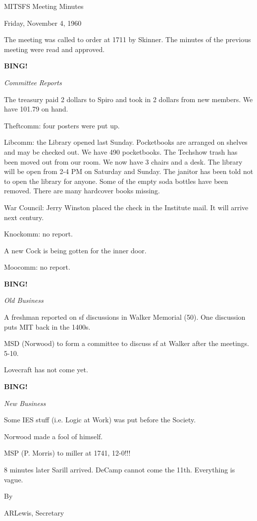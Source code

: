 \documentclass[12pt]{article}
\newcommand{\bing}{{\bf BING!} }
\newcommand{\goto}[1]{\bing \vskip 12pt \centerline{{\em{#1}}}}
\begin{document}
\begin{center}

MITSFS Meeting Minutes

Friday, November 4, 1960

\end{center}
 
\vspace{12pt}

\setlength{\parskip}{6pt}

\noindent
The meeting was called to order at 1711 by Skinner. The minutes of the previous meeting were read and approved.

\goto{Committee Reports}

The treasury paid 2 dollars to Spiro and took in 2 dollars from new members. We have 101.79 on hand.

Theftcomm: four posters were put up.

Libcomm: the Library opened last Sunday. Pocketbooks are arranged on shelves and may be checked out. We have 490 pocketbooks. The Techshow trash has been moved out from our room. We now have 3 chairs and a desk. The library will be open from 2-4 PM on Saturday and Sunday. The janitor has been told not to open the library for anyone. Some of the empty soda bottles have been removed. There are many hardcover books missing.

War Council: Jerry Winston placed the check in the Institute mail. It will arrive next century.

Knockomm: no report.

A new Cock is being gotten for the inner door.

Moocomm: no report.

\goto{Old Business}

A freshman reported on sf discussions in Walker Memorial (50). One discussion puts MIT back in the 1400s.

MSD (Norwood) to form a committee to discuss sf at Walker after the meetings. 5-10.

Lovecraft has not come yet.

\goto{New Business}

Some IES stuff (i.e. Logic at Work) was put before the Society.

Norwood made a fool of himself.

MSP (P. Morris) to miller at 1741, 12-0!!!

8 minutes later Sarill arrived. DeCamp cannot come the 11th. Everything is vague.

\vspace{12pt}

\centerline{By}
\centerline{ARLewis, Secretary}
\end{document}
